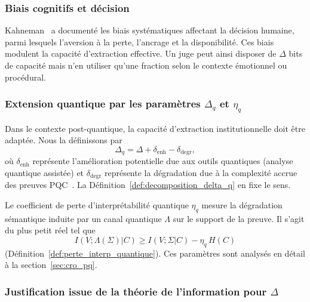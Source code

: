 \begin{sloppypar}
\subsubsection{Biais cognitifs et d\'ecision}
\label{subsubsec:biais_cognitifs}

Kahneman~\cite{Kahneman11} a document\'e les biais syst\'ematiques affectant
la d\'ecision humaine, parmi lesquels l'aversion \`a la perte, l'ancrage et la disponibilit\'e. Ces biais
modulent la capacit\'e d'extraction effective. Un juge peut ainsi disposer de
$\Delta$ bits de capacit\'e mais n'en utiliser qu'une fraction selon le contexte
\'emotionnel ou proc\'edural.

\subsubsection{Extension quantique par les param\`etres $\Delta_q$ et $\eta_q$}
\label{subsubsec:extension_quantique_delta}

Dans le contexte post-quantique, la capacit\'e d'extraction institutionnelle
doit \^etre adapt\'ee. Nous la d\'efinissons par
\begin{equation}
\Delta_q = \Delta + \delta_{\mathrm{enh}} - \delta_{\mathrm{degr}},
\label{eq:delta_q}
\end{equation}
o\`u $\delta_{\mathrm{enh}}$ repr\'esente l'am\'elioration potentielle due aux
outils quantiques (analyse quantique assist\'ee) et $\delta_{\mathrm{degr}}$
repr\'esente la d\'egradation due \`a la complexit\'e accrue des preuves PQC~\cite{Chatterjee2021}. La D\'efinition~\ref{def:decomposition_delta_q} en fixe le sens.

Le coefficient de perte d'interpr\'etabilit\'e quantique $\eta_q$ mesure la
d\'egradation s\'emantique induite par un canal quantique $\Lambda$ sur le
support de la preuve. Il s'agit du plus petit r\'eel tel que
\begin{equation}
I(V;\Lambda(\Sigma)|C) \geq I(V;\Sigma|C) - \eta_q\, H(C)
\label{eq:eta_q}
\end{equation}
(D\'efinition~\ref{def:perte_interp_quantique}). Ces param\`etres sont analys\'es en d\'etail \`a la section~\ref{sec:cro_pq}.

\subsubsection{Justification issue de la th\'eorie de l'information pour $\Delta$}
\label{subsubsec:justification_delta}


\end{sloppypar}
